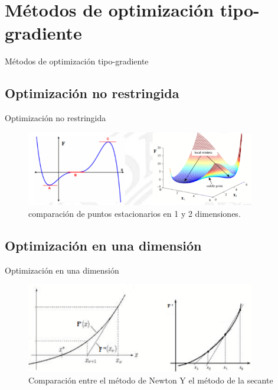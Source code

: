 \documentclass{beamer}
\begin{document}
\section{Métodos de optimización tipo-gradiente}
    \begin{frame}{Métodos de optimización tipo-gradiente}
        \tableofcontents[sections={4}]
    \end{frame}
    \subsection{Optimización no restringida}
        \begin{frame}{Optimización no restringida}
            \begin{figure}[h]
                \centering
                \captionsetup{justification=centering}
                \includegraphics[width=10cm]{Imagenes/Captura de pantalla 2024-03-09 153948.png}
                \caption{comparación de puntos estacionarios en 1 y 2 dimensiones.}
                \centering
            \end{figure}
        \end{frame}
    \subsection{Optimización en una dimensión}
        \begin{frame}{Optimización en una dimensión}
            \begin{figure}[h]
                \centering
                \captionsetup{justification=centering}
                \includegraphics[width=10cm]{Imagenes/Captura de pantalla 2024-03-09 152833.png}
                \caption{Comparación entre el método de Newton Y
                el método de la secante}
                \centering
            \end{figure}
        \end{frame}
\end{document}
